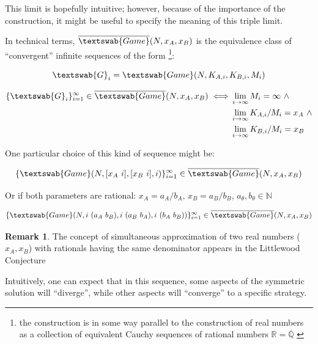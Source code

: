 \documentclass{article}
\theoremstyle{definition}
\newtheorem*{remark}{Remark}
\newcommand{\InfG}[1]{$\overline{\textswab{Game}}(#1)$}
\begin{document}
This limit is hopefully intuitive; however, because of the importance of the construction, it might be useful to specify the meaning of this triple limit.

In technical terms, \InfG{N, x_A, x_B} is the equivalence class of ``convergent'' infinite sequences of the form \footnote{the construction is in some way parallel to the construction of real numbers as a collection of equivalent Cauchy sequences of rational numbers $\mathbb{R} = \overline{\mathbb{Q}}$ \cite{book:TerenceTaoAnalysis}}:

\begin{equation}
    \textswab{G}_i = \textswab{Game}(N, K_{A,i}, K_{B,i}, M_i)
\end{equation}

\begin{equation}
    \begin{split}
        \{\textswab{G}_i\}_{i=1}^\infty \in \overline{\textswab{Game}}(N, x_A, x_B) \iff & \lim_{i\to \infty} M_i = \infty \ \wedge \\ 
        & \lim_{i\to \infty} K_{A,i}/M_i = x_A \ \wedge \\
        & \lim_{i\to \infty} K_{B,i}/M_i = x_B
    \end{split}
\end{equation}

One particular choice of this kind of sequence might be:

\begin{equation}
    \{ \textswab{Game}(N, [ x_A \ i ], [ x_B \ i ] ,i) \}_{i=1}^\infty \in  \overline{\textswab{Game}}(N, x_A, x_B)
\end{equation}

Or if both parameters are rational: $x_A = a_A/b_A$, $x_B = a_B/b_B$, $a_\theta, b_\theta \in \mathbb{N}$

\begin{equation}
    \{ \textswab{Game}(N, i \ (a_A \ b_B), i \ (a_B \ b_A) ,  i \ (b_A \ b_B)) \}_{i=1}^\infty \in  \overline{\textswab{Game}}(N, x_A, x_B)
\end{equation}

\begin{remark}
    The concept of simultaneous approximation of two real numbers ($x_A,x_B$) with rationals having the same denominator appears in the Littlewood Conjecture \cite{paper:LittlewoodConjecture} 
    
\end{remark}

Intuitively, one can expect that in this sequence, some aspects of the symmetric solution will ``diverge'', while other aspects will ``converge'' to a specific strategy.
\end{document}
